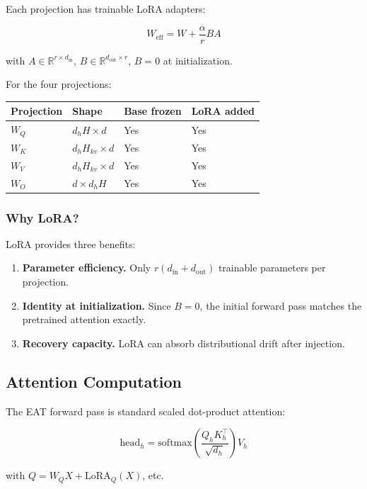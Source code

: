 Each projection has trainable LoRA adapters:

\[
W_\text{eff} = W + \frac{\alpha}{r} B A
\tag{4.1}
\]

with $A \in \mathbb{R}^{r \times d_\text{in}}$, $B \in \mathbb{R}^{d_\text{out} \times r}$, 
$B = 0$ at initialization.

For the four projections:

\begin{table}[H]
\centering
\small
\begin{tabular}{llll}
\toprule
\textbf{Projection} & \textbf{Shape} & \textbf{Base frozen} & \textbf{LoRA added} \\
\midrule
$W_Q$ & $d_h H \times d$ & Yes & Yes \\
$W_K$ & $d_h H_{kv} \times d$ & Yes & Yes \\
$W_V$ & $d_h H_{kv} \times d$ & Yes & Yes \\
$W_O$ & $d \times d_h H$ & Yes & Yes \\
\bottomrule
\end{tabular}
\end{table}

\subsubsection{Why LoRA?}

LoRA provides three benefits:

\begin{enumerate}
\item \textbf{Parameter efficiency.} Only $r(d_\text{in} + d_\text{out})$ trainable
  parameters per projection.
\item \textbf{Identity at initialization.} Since $B = 0$, the initial forward pass
  matches the pretrained attention exactly.
\item \textbf{Recovery capacity.} LoRA can absorb distributional drift after
  injection.

\end{enumerate}
\subsection{Attention Computation}

The EAT forward pass is standard scaled dot-product attention:

\[
\text{head}_h = \text{softmax}\!\left(\frac{Q_h K_h^\top}{\sqrt{d_h}}\right) V_h
\tag{4.2}
\]

with $Q = W_Q X + \text{LoRA}_Q(X)$, etc.

